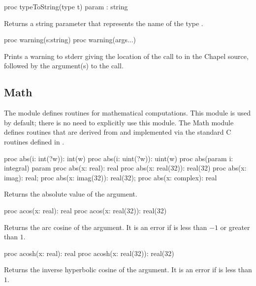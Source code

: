 \begin{protohead}
proc typeToString(type t) param : string
\end{protohead}
\begin{protobody}
Returns a string parameter that represents the name of the
type .
\end{protobody}

\begin{protohead}
proc warning(s:string)
proc warning(args...)
\end{protohead}
\begin{protobody}
Prints a warning to stderr giving the location of the call to 
in the Chapel source, followed by the argument(s) to the call.
\end{protobody}


\subsection{Math}
\label{Math}

The module  defines routines for mathematical computations.
This module is used by default; there is no need to explicitly use
this module.  The Math module defines routines that are derived from
and implemented via the standard C routines defined in .

\vspace{1pc}

\begin{protohead}
proc abs(i: int(?w)): int(w)
proc abs(i: uint(?w)): uint(w)
proc abs(param i: integral) param
proc abs(x: real): real
proc abs(x: real(32)): real(32)
proc abs(x: imag): real;
proc abs(x: imag(32)): real(32);
proc abs(x: complex): real
\end{protohead}
\begin{protobody}
Returns the absolute value of the argument.
\end{protobody}

\begin{protohead}
proc acos(x: real): real
proc acos(x: real(32)): real(32)
\end{protohead}
\begin{protobody}
Returns the arc cosine of the argument.  It is an error if  is
less than $-1$ or greater than $1$.
\end{protobody}

\begin{protohead}
proc acosh(x: real): real
proc acosh(x: real(32)): real(32)
\end{protohead}
\begin{protobody}
Returns the inverse hyperbolic cosine of the argument.  It is an error
if  is less than $1$.
\end{protobody}

